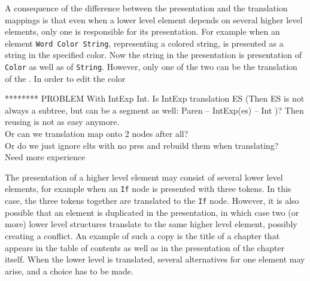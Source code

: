 \toHere     %


A consequence of the difference between the presentation and the translation mappings is that even when a lower level element depends on several higher level elements, only one is responsible for its presentation. For example when an element \verb|Word Color String|, representing a colored string, is presented as a string in the specified color. Now the string in the presentation is presentation of \verb|Color| as well as of \verb|String|. However, only one of the two can be the translation of the . In order to edit the color


   

******** PROBLEM With IntExp  Int. 
Is IntExp translation ES (Then ES is not always a subtree, but can be a segment as well: Paren -- IntExp(es) -- Int )? Then reusing is not as easy anymore.\\
Or can we translation map onto 2 nodes after all?\\
Or do we just ignore elts with no pres and rebuild them when translating?\\

Need more experience

\fromHere  %

%
%






The presentation of a higher level element may consist of several lower level elements, for example when an \verb|If| node is presented with three tokens. In this case, the three tokens together are translated to the \verb|If| node. However, it is also possible that an element is duplicated in the presentation, in which case two (or more) lower level structures  translate to the same higher level element, possibly creating a conflict. An example of such a copy is the title of a chapter that appears in the table of contents as well as in the presentation of the chapter itself. When the lower level is translated, several alternatives for one element may arise, and a choice has to be made. 

